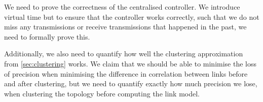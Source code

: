 We need to prove the correctness of the centralised controller. We introduce virtual time but to ensure that the controller works correctly, such that we do not miss any transmissions or receive transmissions that happened in the past, we need to formally prove this.\smallbreak

Additionally, we also need to quantify how well the clustering approximation from \autoref{sec:clustering} works. We claim that we should be able to minimise the loss of precision when minimising the difference in correlation between links before and after clustering, but we need to quantify exactly how much precision we lose, when clustering the topology before computing the link model.

